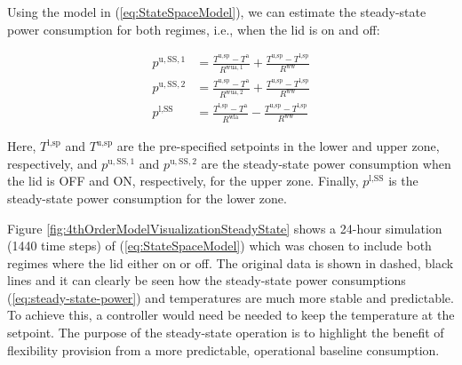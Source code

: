 \documentclass[lettersize,journal]{IEEEtran}
\begin{document}
Using the model in (\ref{eq:StateSpaceModel}), we can estimate the steady-state power consumption for both regimes, i.e., when the lid is on and off:

\begin{subequations}\label{eq:steady-state-power}
    \begin{align}
        p^{\text{u},\text{SS},1} & = \frac{T^{\text{u},\text{sp}} - T^{\text{a}}}{R^{\text{wua},1}}  + \frac{T^{\text{u},\text{sp}}-T^{\text{l},\text{sp}}}{R^{\text{ww}}} \label{eq1:steady-state-power} \\
        p^{\text{u},\text{SS},2} & = \frac{T^{\text{u},\text{sp}} - T^{\text{a}}}{R^{\text{wua},2}} + \frac{T^{\text{u},\text{sp}}-T^{\text{l},\text{sp}}}{R^{\text{ww}}} \label{eq2:steady-state-power}  \\
        p^{\text{l},\text{SS}}   & = \frac{T^{\text{l},\text{sp}} - T^{\text{a}}}{R^{\text{wla}}} - \frac{T^{\text{u},\text{sp}}-T^{\text{l},\text{sp}}}{R^{\text{ww}}} \label{eq3:steady-state-power}
    \end{align}
\end{subequations}

Here, $T^{\text{l},\text{sp}}$ and $T^{\text{u},\text{sp}}$ are the pre-specified setpoints in the lower and upper zone, respectively, and $p^{\text{u},\text{SS},1}$ and $p^{\text{u},\text{SS},2}$ are the steady-state power consumption when the lid is OFF and ON, respectively, for the upper zone. Finally, $p^{\text{l},\text{SS}}$ is the steady-state power consumption for the lower zone.

Figure \ref{fig:4thOrderModelVisualizationSteadyState} shows a 24-hour simulation (1440 time steps) of (\ref{eq:StateSpaceModel}) which was chosen to include both regimes where the lid either on or off. The original data is shown in dashed, black lines and it can clearly be seen how the steady-state power consumptions (\ref{eq:steady-state-power}) and temperatures are much more stable and predictable. To achieve this, a controller would need be needed to keep the temperature at the setpoint. The purpose of the steady-state operation is to highlight the benefit of flexibility provision from a more predictable, operational baseline consumption.
\end{document}
